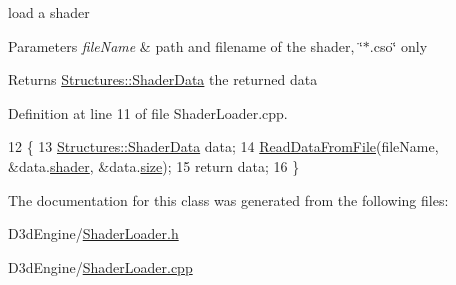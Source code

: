 load a shader 


\begin{DoxyParams}{Parameters}
{\em file\+Name} & path and filename of the shader, \char`\"{}$\ast$.\+cso\char`\"{} only \\
\hline
\end{DoxyParams}
\begin{DoxyReturn}{Returns}
\mbox{\hyperlink{struct_structures_1_1_shader_data}{Structures\+::\+Shader\+Data}} the returned data 
\end{DoxyReturn}


Definition at line 11 of file Shader\+Loader.\+cpp.


\begin{DoxyCode}
12 \{
13     \mbox{\hyperlink{struct_structures_1_1_shader_data}{Structures::ShaderData}} data;
14     \mbox{\hyperlink{_direct_x_helper_8h_a0ae920cd8d8c647c6e7c9cb2d3b6c4ba}{ReadDataFromFile}}(fileName, &data.\mbox{\hyperlink{struct_structures_1_1_shader_data_a1a0c91d7cc06e0081ddf4693911d2721}{shader}}, &data.\mbox{\hyperlink{struct_structures_1_1_shader_data_a0f54e401cae3304ffcbb317a6c0e12f7}{size}});
15     \textcolor{keywordflow}{return} data;
16 \}
\end{DoxyCode}


The documentation for this class was generated from the following files\+:\begin{DoxyCompactItemize}
\item 
D3d\+Engine/\mbox{\hyperlink{_shader_loader_8h}{Shader\+Loader.\+h}}\item 
D3d\+Engine/\mbox{\hyperlink{_shader_loader_8cpp}{Shader\+Loader.\+cpp}}\end{DoxyCompactItemize}
